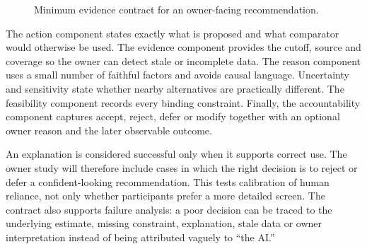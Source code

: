 \begin{figure}[H]
\centering
{}
\caption{Minimum evidence contract for an owner-facing recommendation.}
\label{fig:recommendation_contract}
\end{figure}

The action component states exactly what is proposed and what comparator would
otherwise be used. The evidence component provides the cutoff, source and
coverage so the owner can detect stale or incomplete data. The reason component
uses a small number of faithful factors and avoids causal language. Uncertainty
and sensitivity state whether nearby alternatives are practically different.
The feasibility component records every binding constraint. Finally, the
accountability component captures accept, reject, defer or modify together with
an optional owner reason and the later observable outcome.

An explanation is considered successful only when it supports correct use. The
owner study will therefore include cases in which the right decision is to
reject or defer a confident-looking recommendation. This tests calibration of
human reliance, not only whether participants prefer a more detailed screen.
The contract also supports failure analysis: a poor decision can be traced to
the underlying estimate, missing constraint, explanation, stale data or owner
interpretation instead of being attributed vaguely to ``the AI.''

